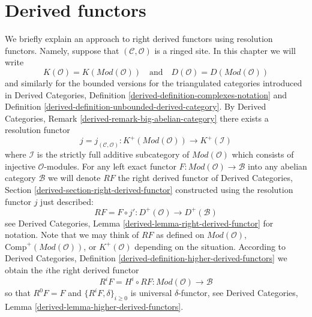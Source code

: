 \section{Derived functors}
\label{sites-cohomology-section-derived-functors}
We briefly explain an approach to right derived functors using resolution
functors. Namely, suppose that $(\mathcal{C}, \mathcal{O})$ is a ringed site.
In this chapter we will write
$$
K(\mathcal{O}) = K(\textit{Mod}(\mathcal{O}))
\quad
\text{and}
\quad
D(\mathcal{O}) = D(\textit{Mod}(\mathcal{O}))
$$
and similarly for the bounded versions for the triangulated categories
introduced in
Derived Categories, Definition \ref{derived-definition-complexes-notation} and
Definition \ref{derived-definition-unbounded-derived-category}.
By
Derived Categories, Remark \ref{derived-remark-big-abelian-category}
there exists a resolution functor
$$
j = j_{(\mathcal{C}, \mathcal{O})} :
K^{+}(\textit{Mod}(\mathcal{O}))
\longrightarrow
K^{+}(\mathcal{I})
$$
where $\mathcal{I}$ is the strictly full additive subcategory of
$\textit{Mod}(\mathcal{O})$ which consists of injective $\mathcal{O}$-modules.
For any left exact functor $F : \textit{Mod}(\mathcal{O}) \to \mathcal{B}$
into any abelian category $\mathcal{B}$ we will denote $RF$ the
right derived functor of
Derived Categories, Section \ref{derived-section-right-derived-functor}
constructed using the resolution functor $j$ just described:
\begin{equation}
\label{equation-RF}
RF = F \circ j' : D^{+}(\mathcal{O}) \longrightarrow D^{+}(\mathcal{B})
\end{equation}
see
Derived Categories, Lemma \ref{derived-lemma-right-derived-functor}
for notation. Note that we may think of $RF$ as defined on
$\textit{Mod}(\mathcal{O})$, $\text{Comp}^{+}(\textit{Mod}(\mathcal{O}))$, or
$K^{+}(\mathcal{O})$ depending on the situation. According to
Derived Categories, Definition \ref{derived-definition-higher-derived-functors}
we obtain the $i$the right derived functor
\begin{equation}
\label{equation-RFi}
R^iF = H^i \circ RF : \textit{Mod}(\mathcal{O}) \longrightarrow \mathcal{B}
\end{equation}
so that $R^0F = F$ and $\{R^iF, \delta\}_{i \geq 0}$ is universal
$\delta$-functor, see
Derived Categories, Lemma \ref{derived-lemma-higher-derived-functors}.

